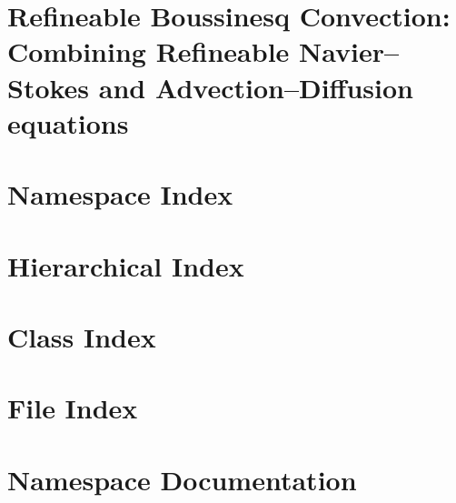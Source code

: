 \let\mypdfximage\pdfximage\def\pdfximage{\immediate\mypdfximage}\documentclass[twoside]{book}
\newcommand{\+}{\discretionary{\mbox{\scriptsize$\hookleftarrow$}}{}{}}
\begin{document}
\raggedbottom

\hypersetup{pageanchor=false,
             bookmarksnumbered=true,
             pdfencoding=unicode
            }
\hypersetup{pageanchor=true}

\chapter{Refineable Boussinesq Convection\+: Combining Refineable Navier--Stokes and Advection--Diffusion equations}
\label{index}\hypertarget{index}{}
\chapter{Namespace Index}

\chapter{Hierarchical Index}

\chapter{Class Index}

\chapter{File Index}

\chapter{Namespace Documentation}




\end{document}
